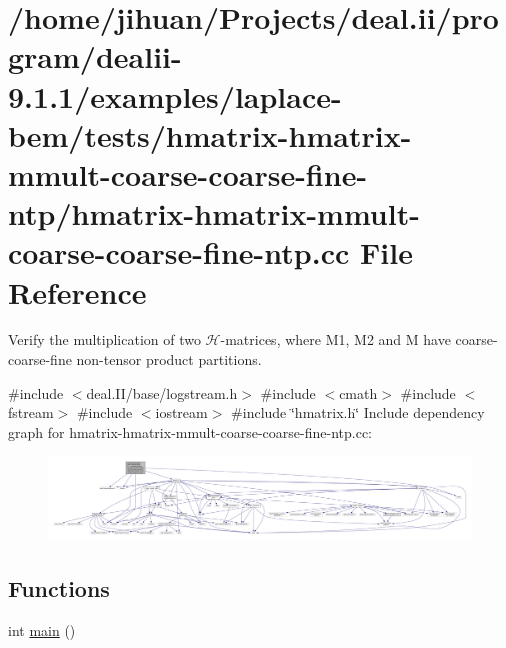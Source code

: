 \hypertarget{hmatrix-hmatrix-mmult-coarse-coarse-fine-ntp_8cc}{}\section{/home/jihuan/\+Projects/deal.ii/program/dealii-\/9.1.1/examples/laplace-\/bem/tests/hmatrix-\/hmatrix-\/mmult-\/coarse-\/coarse-\/fine-\/ntp/hmatrix-\/hmatrix-\/mmult-\/coarse-\/coarse-\/fine-\/ntp.cc File Reference}
\label{hmatrix-hmatrix-mmult-coarse-coarse-fine-ntp_8cc}


Verify the multiplication of two $\mathcal{H}$-\/matrices, where M1, M2 and M have coarse-\/coarse-\/fine non-\/tensor product partitions.  


{\ttfamily \#include $<$deal.\+I\+I/base/logstream.\+h$>$}\newline
{\ttfamily \#include $<$cmath$>$}\newline
{\ttfamily \#include $<$fstream$>$}\newline
{\ttfamily \#include $<$iostream$>$}\newline
{\ttfamily \#include \char`\"{}hmatrix.\+h\char`\"{}}\newline
Include dependency graph for hmatrix-\/hmatrix-\/mmult-\/coarse-\/coarse-\/fine-\/ntp.cc\+:\nopagebreak
\begin{figure}[H]
\begin{center}
\leavevmode
\includegraphics[width=350pt]{hmatrix-hmatrix-mmult-coarse-coarse-fine-ntp_8cc__incl}
\end{center}
\end{figure}
\subsection*{Functions}
\begin{DoxyCompactItemize}
\item 
int \hyperlink{hmatrix-hmatrix-mmult-coarse-coarse-fine-ntp_8cc_ae66f6b31b5ad750f1fe042a706a4e3d4}{main} ()
\end{DoxyCompactItemize}



